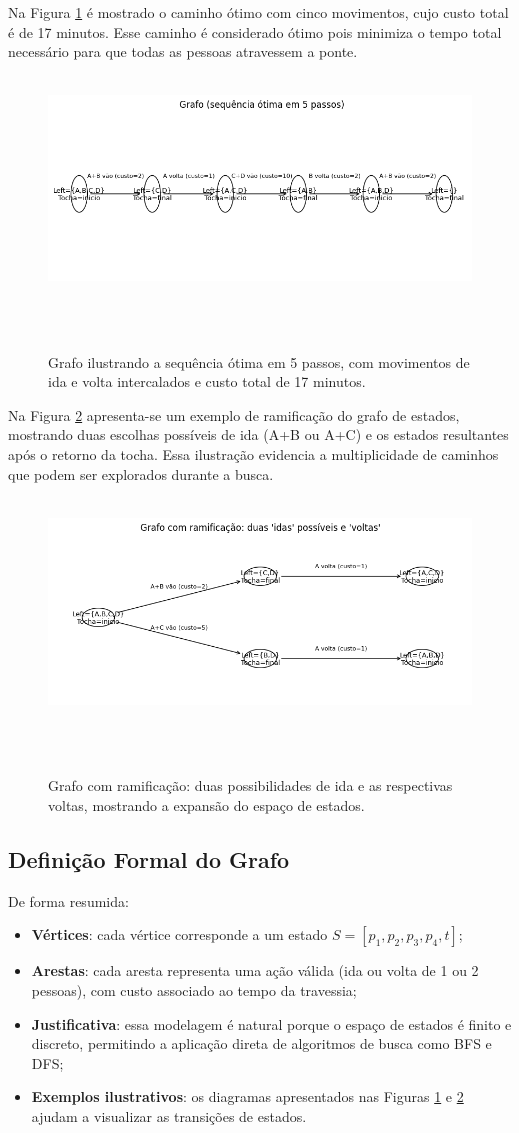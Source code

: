 \documentclass[12pt,a4paper]{article}
\begin{document}
Na Figura \ref{fig:cen1} é mostrado o caminho ótimo com cinco movimentos, cujo custo total é de 17 minutos. Esse caminho é considerado ótimo pois minimiza o tempo total necessário para que todas as pessoas atravessem a ponte.
\begin{figure}[H]
    \centering
    \includegraphics[width=0.8\linewidth]{optimal_path}
    \caption{Grafo ilustrando a sequência ótima em 5 passos, com movimentos de ida e volta intercalados e custo total de 17 minutos.}
    \label{fig:cen1}
\end{figure}

Na Figura \ref{fig:cen2} apresenta-se um exemplo de ramificação do grafo de estados, mostrando duas escolhas possíveis de ida (A+B ou A+C) e os estados resultantes após o retorno da tocha. Essa ilustração evidencia a multiplicidade de caminhos que podem ser explorados durante a busca.

\begin{figure}[H]
    \centering
    \includegraphics[width=0.8\linewidth]{ramification.png}
    \caption{Grafo com ramificação: duas possibilidades de ida e as respectivas voltas, mostrando a expansão do espaço de estados.}
    \label{fig:cen2}
\end{figure}

\subsection{Definição Formal do Grafo}
De forma resumida:
\begin{itemize}
\item \textbf{Vértices}: cada vértice corresponde a um estado $S = [p_1, p_2, p_3, p_4, t]$;
\item \textbf{Arestas}: cada aresta representa uma ação válida (ida ou volta de 1 ou 2 pessoas), com custo associado ao tempo da travessia;
\item \textbf{Justificativa}: essa modelagem é natural porque o espaço de estados é finito e discreto, permitindo a aplicação direta de algoritmos de busca como BFS e DFS;
\item \textbf{Exemplos ilustrativos}: os diagramas apresentados nas Figuras \ref{fig:cen1} e \ref{fig:cen2} ajudam a visualizar as transições de estados.
\end{itemize}
\end{document}
